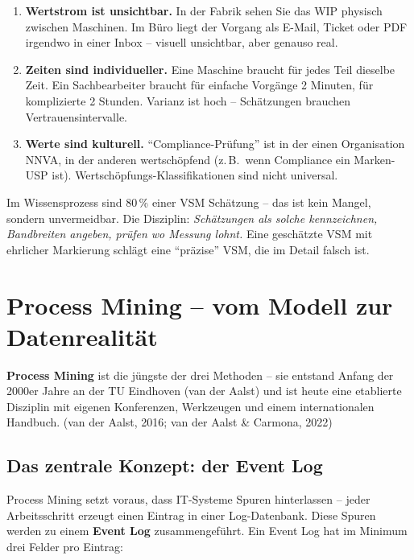 \documentclass[11pt,a4paper,oneside]{article}
\newcommand{\fachbegriff}[1]{\textbf{#1}}
\newcommand{\quelle}[1]{{\footnotesize\color{lpGray}(#1)}}
\begin{document}
\begin{enumerate}
  \item \fachbegriff{Wertstrom ist unsichtbar.} In der Fabrik sehen Sie das WIP physisch zwischen Maschinen. Im Büro liegt der Vorgang als E-Mail, Ticket oder PDF irgendwo in einer Inbox -- visuell unsichtbar, aber genauso real.
  \item \fachbegriff{Zeiten sind individueller.} Eine Maschine braucht für jedes Teil dieselbe Zeit. Ein Sachbearbeiter braucht für einfache Vorgänge 2 Minuten, für komplizierte 2 Stunden. Varianz ist hoch -- Schätzungen brauchen Vertrauensintervalle.
  \item \fachbegriff{Werte sind kulturell.} ``Compliance-Prüfung'' ist in der einen Organisation NNVA, in der anderen wertschöpfend (z.\,B.\ wenn Compliance ein Marken-USP ist). Wertschöpfungs-Klassifikationen sind nicht universal.
\end{enumerate}

\begin{merkbox}
Im Wissensprozess sind 80\,\% einer VSM Schätzung -- das ist kein Mangel, sondern unvermeidbar. Die Disziplin: \emph{Schätzungen als solche kennzeichnen, Bandbreiten angeben, prüfen wo Messung lohnt.} Eine geschätzte VSM mit ehrlicher Markierung schlägt eine ``präzise'' VSM, die im Detail falsch ist.
\end{merkbox}

\section{Process Mining -- vom Modell zur Datenrealität}

\fachbegriff{Process Mining} ist die jüngste der drei Methoden -- sie entstand Anfang der 2000er Jahre an der TU Eindhoven (van der Aalst) und ist heute eine etablierte Disziplin mit eigenen Konferenzen, Werkzeugen und einem internationalen Handbuch. \quelle{van der Aalst, 2016; van der Aalst \& Carmona, 2022}

\subsection{Das zentrale Konzept: der Event Log}

Process Mining setzt voraus, dass IT-Systeme Spuren hinterlassen -- jeder Arbeitsschritt erzeugt einen Eintrag in einer Log-Datenbank. Diese Spuren werden zu einem \fachbegriff{Event Log} zusammengeführt. Ein Event Log hat im Minimum drei Felder pro Eintrag:
\end{document}
